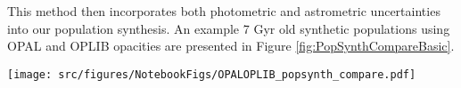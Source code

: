 This method then incorporates both photometric and astrometric uncertainties
into our population synthesis. An example 7 Gyr old synthetic populations
using OPAL and OPLIB opacities are presented in Figure
\ref{fig:PopSynthCompareBasic}.

\begin{figure*}
	\centering
	\texttt{[image: src/figures/NotebookFigs/OPALOPLIB\_popsynth\_compare.pdf]}
	\caption{Population synthesis results for models evolved with OPAL (left)
	and models evolved with OPLIB (right). A Gaussian kernel-density estimate
	has been overlaid to better highlight the density variations.}
	\label{fig:PopSynthCompareBasic}
\end{figure*}
